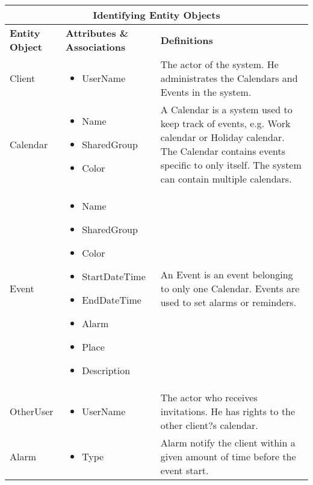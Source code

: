 \begin{tabular}{|l|p{5.3cm}|p{5.3cm}|}
\hline
\multicolumn{3}{|c|}{Identifying Entity Objects} \\
\hline
\textbf{Entity Object} & \textbf{Attributes \& Associations} & \textbf{Definitions} \\
\hline
 Client & 
\begin{itemize}
     \item UserName
\end{itemize} &
The actor of the system. He administrates the Calendars and Events in the system. \\ \hline
Calendar & 
\begin{itemize}
	\item Name
	\item SharedGroup
	\item Color
  \end{itemize} & 
A Calendar is a system used to keep track of events, e.g. Work calendar or Holiday calendar. The Calendar contains events specific to only itself. The system can contain multiple calendars.\\ \hline
Event &
\begin{itemize}
	\item Name
	\item SharedGroup
	\item Color
	\item StartDateTime
	\item EndDateTime
	\item Alarm
	\item Place
	\item Description
\end{itemize} &
An Event is an event belonging to only one Calendar. Events are used to set alarms or reminders. \\ \hline
OtherUser & 
\begin{itemize} 
	\item UserName 
\end{itemize} & 
The actor who receives invitations. He has rights to the other client?s calendar. \\ \hline
Alarm &
\begin{itemize} 
	\item Type
\end{itemize} &
Alarm notify the client within a given amount of time before the event start.  \\ \hline
\end{tabular}
